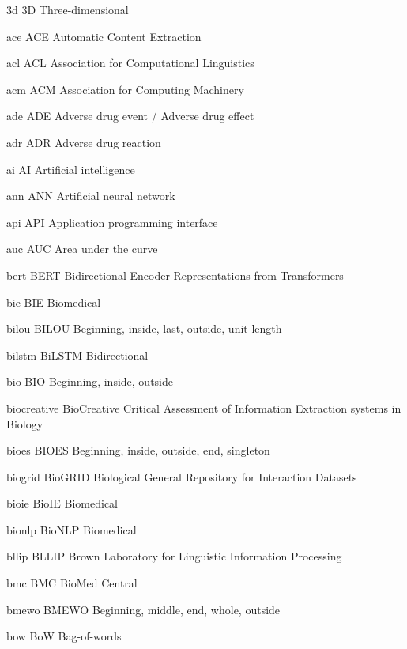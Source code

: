 \newabbreviation
{3d}
{3D}
{Three-dimensional}

\newabbreviation
{ace}
{ACE}
{Automatic Content Extraction}

\newabbreviation
{acl}
{ACL}
{Association for Computational Linguistics}

\newabbreviation
{acm}
{ACM}
{Association for Computing Machinery}

\newabbreviation
{ade}
{ADE}
{Adverse drug event / Adverse drug effect}

\newabbreviation
{adr}
{ADR}
{Adverse drug reaction}

\newabbreviation
{ai}
{AI}
{Artificial intelligence}

\newabbreviation
{ann}
{ANN}
{Artificial neural network}

\newabbreviation
{api}
{API}
{Application programming interface}

\newabbreviation
{auc}
{AUC}
{Area under the curve}

\newabbreviation
{bert}
{BERT}
{Bidirectional Encoder Representations from Transformers}

\newabbreviation
{bie}
{BIE}
{Biomedical }

\newabbreviation
{bilou}
{BILOU}
{Beginning, inside, last, outside, unit-length}

\newabbreviation
{bilstm}
{BiLSTM}
{Bidirectional }

\newabbreviation
{bio}
{BIO}
{Beginning, inside, outside}

\newabbreviation
{biocreative}
{BioCreative}
{Critical Assessment of Information Extraction systems in Biology}

\newabbreviation
{bioes}
{BIOES}
{Beginning, inside, outside, end, singleton}

\newabbreviation
{biogrid}
{BioGRID}
{Biological General Repository for Interaction Datasets}

\newabbreviation
{bioie}
{BioIE}
{Biomedical }

\newabbreviation
{bionlp}
{BioNLP}
{Biomedical }

\newabbreviation
{bllip}
{BLLIP}
{Brown Laboratory for Linguistic Information Processing}

\newabbreviation
{bmc}
{BMC}
{BioMed Central}

\newabbreviation
{bmewo}
{BMEWO}
{Beginning, middle, end, whole, outside}

\newabbreviation
{bow}
{BoW}
{Bag-of-words}

